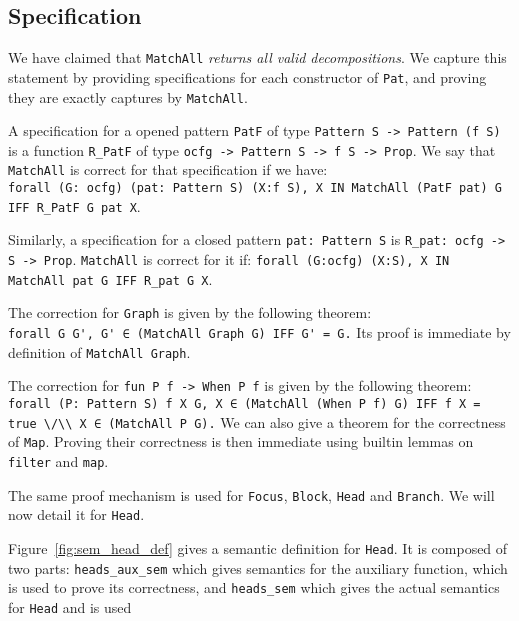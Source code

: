 \documentclass[11pt]{article}
\newcommand{\inlinecoq}[1]{\mbox{\lstinline[style=customcoq,columns=fixed,basewidth=.48em]{#1}}}
\newcommand{\ilc}[1]{\inlinecoq{#1}}
\newcommand{\yzt}[1]{\textcolor{ForestGreen!50}{#1}}
\newcommand{\pat}{\texttt{Pat}\xspace}
\begin{document}
\subsection{Specification}

\yzt{We have claimed that \ilc{MatchAll} \emph{returns all valid decompositions}. We capture this statement by providing specifications for each constructor of \pat, and proving they are exactly captures by \ilc{MatchAll}.}

A specification for a opened pattern \ilc{PatF} of type \ilc{Pattern S -> Pattern (f S)} is a function \ilc{R_PatF} of type \ilc{ocfg -> Pattern S -> f S -> Prop}. We say that \ilc{MatchAll} is correct for that specification if we have:\\\ilc{forall (G: ocfg) (pat: Pattern S) (X:f S), X IN MatchAll (PatF pat) G IFF R_PatF G pat X}.

Similarly, a specification for a closed pattern \ilc{pat: Pattern S} is \ilc{R_pat: ocfg -> S -> Prop}. \ilc{MatchAll} is correct for it if: \ilc{forall (G:ocfg) (X:S), X IN MatchAll pat G IFF R_pat G X}. 

The correction for \ilc{Graph} is given by the following theorem:\\\ilc{forall G G', G' ∈ (MatchAll Graph G) IFF G' = G.} Its proof is immediate by definition of \ilc{MatchAll Graph}.

The correction for \ilc{fun P f -> When P f} is given by the following theorem:\\\ilc{forall (P: Pattern S) f X G, X ∈ (MatchAll (When P f) G) IFF f X = true \/\\ X ∈ (MatchAll P G).} We can also give a theorem for the correctness of \ilc{Map}. Proving their correctness is then immediate using builtin lemmas on \ilc{filter} and \ilc{map}.

The same proof mechanism is used for \ilc{Focus}, \ilc{Block}, \ilc{Head} and \ilc{Branch}. We will now detail it for \ilc{Head}.


Figure~\ref{fig:sem_head_def} gives a semantic definition for \ilc{Head}. It is composed of two parts: \ilc{heads_aux_sem} which gives semantics for the auxiliary function, which is used to prove its correctness, and \ilc{heads_sem} which gives the actual semantics for \ilc{Head} and is used 
\end{document}
